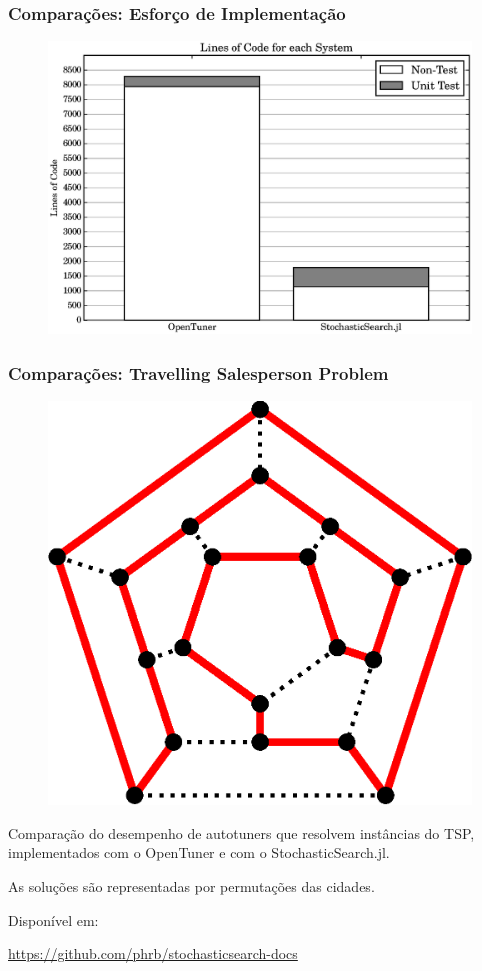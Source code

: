 \documentclass[10pt, compress]{beamer}
\begin{document}
\begin{frame}[fragile]
    \frametitle{Comparações: Esforço de Implementação}
    \begin{figure}[H]
        \centering
        \includegraphics[width=1\textwidth]{loc_comparison}
    \end{figure}%
\end{frame}

\begin{frame}[fragile]
    \frametitle{Comparações: Travelling Salesperson Problem}
    \begin{figure}[H]
        \centering
        \includegraphics[width=.33\textwidth]{hamiltonianpath}
    \end{figure}%
    Comparação do desempenho de \alert{autotuners} que resolvem
    instâncias do TSP, implementados com o OpenTuner e com o
    StochasticSearch.jl.
    \pause

    As soluções são representadas por \alert{permutações} das cidades.

    \pause
    Disponível em:

    \url{https://github.com/phrb/stochasticsearch-docs}
\end{frame}
\end{document}
